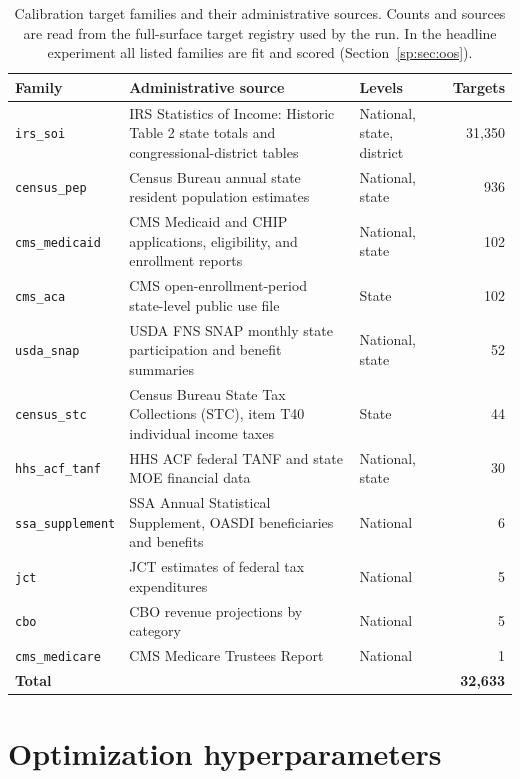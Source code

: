 \begin{table}[H]
\centering
{\tablefont
\begin{tabular}{@{}p{}p{}p{}r@{}}
\toprule
Family & Administrative source & Levels & Targets \\
\midrule
\texttt{irs\_soi} & IRS Statistics of Income: Historic Table 2 state totals and congressional-district tables & National, state, district & 31{,}350 \\
\texttt{census\_pep} & Census Bureau annual state resident population estimates & National, state & 936 \\
\texttt{cms\_medicaid} & CMS Medicaid and CHIP applications, eligibility, and enrollment reports & National, state & 102 \\
\texttt{cms\_aca} & CMS open-enrollment-period state-level public use file & State & 102 \\
\texttt{usda\_snap} & USDA FNS SNAP monthly state participation and benefit summaries & National, state & 52 \\
\texttt{census\_stc} & Census Bureau State Tax Collections (STC), item T40 individual income taxes & State & 44 \\
\texttt{hhs\_acf\_tanf} & HHS ACF federal TANF and state MOE financial data & National, state & 30 \\
\texttt{ssa\_supplement} & SSA Annual Statistical Supplement, OASDI beneficiaries and benefits & National & 6 \\
\texttt{jct} & JCT estimates of federal tax expenditures & National & 5 \\
\texttt{cbo} & CBO revenue projections by category & National & 5 \\
\texttt{cms\_medicare} & CMS Medicare Trustees Report & National & 1 \\
\midrule
\textbf{Total} & & & \textbf{32{,}633} \\
\bottomrule
\end{tabular}
}
\caption{Calibration target families and their administrative sources. Counts and sources are read from
the full-surface target registry used by the run. In the headline experiment all listed families are fit
and scored (Section~\ref{sp:sec:oos}).}
\label{sp:tab:target_sources}
\end{table}

\section{Optimization hyperparameters}
\label{sp:app:hyperparameters}

